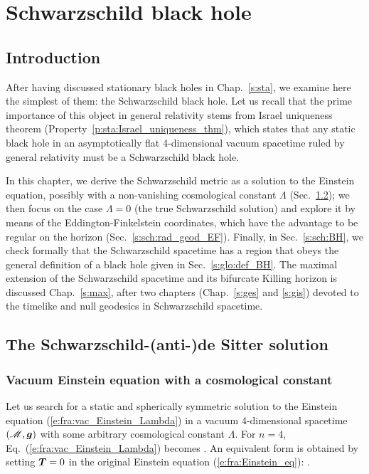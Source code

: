 \chapter{Schwarzschild black hole}
\label{s:sch}

\minitoc

\section{Introduction}

After having discussed stationary black holes in Chap.~\ref{s:sta},
we examine here the simplest of them: the Schwarzschild black hole.
Let us recall that the prime importance of this object
in general relativity stems from Israel uniqueness theorem
(Property~\ref{p:sta:Israel_uniqueness_thm}),
which states that any static black hole in an asymptotically flat 4-dimensional vacuum
spacetime ruled by general relativity must be a Schwarzschild black hole.

In this chapter, we derive the Schwarzschild metric as a solution to the
Einstein equation, possibly with a non-vanishing cosmological constant
$\Lambda$ (Sec.~\ref{s:sch:Sch_sol_lamb}); we then focus on the case $\Lambda=0$
(the true Schwarzschild solution) and explore it by means of the
Eddington-Finkelstein coordinates, which have
the advantage to be regular on the horizon (Sec.~\ref{s:sch:rad_geod_EF}).
Finally, in Sec.~\ref{s:sch:BH}, we check formally that the Schwarzschild spacetime has a region that obeys the general definition of a black hole given in
Sec.~\ref{s:glo:def_BH}. The maximal extension of the Schwarzschild
spacetime and its bifurcate Killing horizon
is discussed Chap.~\ref{s:max}, after two chapters (Chap.~\ref{s:ges} and \ref{s:gis})
devoted to the timelike and null geodesics in Schwarzschild
spacetime.

\section{The Schwarzschild-(anti-)de Sitter solution} \label{s:sch:Sch_sol_lamb}

\subsection{Vacuum Einstein equation with a cosmological constant}

Let us search for a static and spherically symmetric solution to the
Einstein equation (\ref{e:fra:vac_Einstein_Lambda}) in a vacuum
4-dimensional spacetime $(\mathscr{M},\bm{g})$ with some arbitrary cosmological constant
$\Lambda$. For $n=4$, Eq.~(\ref{e:fra:vac_Einstein_Lambda}) becomes
\be \label{e:sch:vac_Einstein_eq_Lamb}
     .
\ee
An equivalent form is obtained by setting $\bm{T}=0$
in the original Einstein equation (\ref{e:fra:Einstein_eq}):
\be \label{e:sch:vac_Einstein_eq}
     .
\ee

